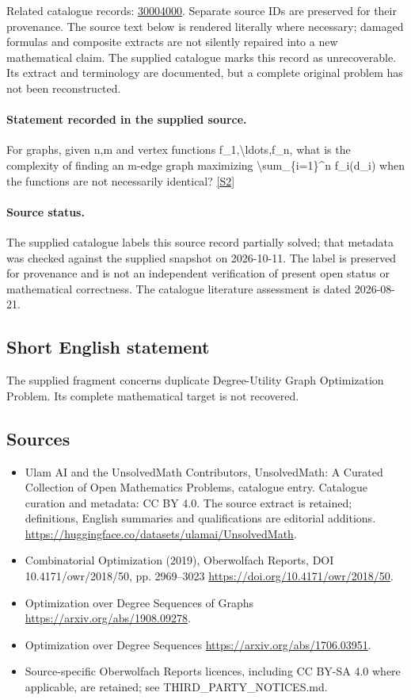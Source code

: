 \documentclass[11pt]{article}
\begin{document}
Related catalogue records: \href{https://mehmetmars7.github.io/Erdosproblems-llm-hunter/problem.html?type=open_problems&id=30004000}{30004000}. Separate source IDs are preserved for their provenance.
The source text below is rendered literally where necessary; damaged formulas and composite extracts are not silently repaired into a new mathematical claim.
The supplied catalogue marks this record as unrecoverable. Its extract and terminology are documented, but a complete original problem has not been reconstructed.
\paragraph{Statement recorded in the supplied source.}
For graphs, given n,m and vertex functions f\_1,\textbackslash{}ldots,f\_n, what is the complexity of finding an m-edge graph maximizing \textbackslash{}sum\_\{i=1\}\textasciicircum{}n f\_i(d\_i) when the functions are not necessarily identical? \href{https://doi.org/10.4171/owr/2018/50}{[S2]}
\paragraph{Source status.}
The supplied catalogue labels this source record partially solved; that metadata was checked against the supplied snapshot on 2026-10-11. The label is preserved for provenance and is not an independent verification of present open status or mathematical correctness. The catalogue literature assessment is dated 2026-08-21.
\subsection{Short English statement}
The supplied fragment concerns duplicate Degree-Utility Graph Optimization Problem. Its complete mathematical target is not recovered.
\subsection{Sources}
\begin{itemize}
\item[S1] Ulam AI and the UnsolvedMath Contributors, UnsolvedMath: A Curated Collection of Open Mathematics Problems, catalogue entry. Catalogue curation and metadata: CC BY 4.0. The source extract is retained; definitions, English summaries and qualifications are editorial additions.
\url{https://huggingface.co/datasets/ulamai/UnsolvedMath}.
\item[S2] Combinatorial Optimization (2019), Oberwolfach Reports, DOI 10.4171/owr/2018/50, pp. 2969--3023
\url{https://doi.org/10.4171/owr/2018/50}.
\item[S3] Optimization over Degree Sequences of Graphs
\url{https://arxiv.org/abs/1908.09278}.
\item[S4] Optimization over Degree Sequences
\url{https://arxiv.org/abs/1706.03951}.
\item Source-specific Oberwolfach Reports licences, including CC BY-SA 4.0 where applicable, are retained; see THIRD\_PARTY\_NOTICES.md.
\end{itemize}
\end{document}
